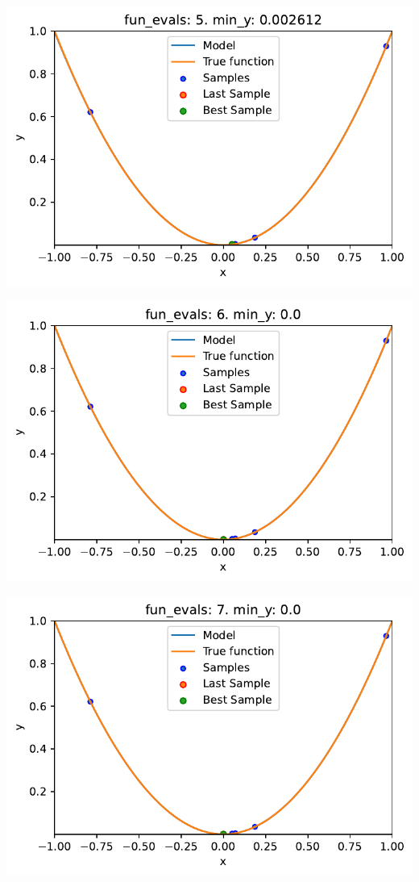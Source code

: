 \documentclass[
  letterpaper,
  DIV=11,
  numbers=noendperiod]{scrreprt}
\begin{document}
\includegraphics{010_num_spot_sklearn_surrogate_files/figure-pdf/cell-24-output-4.pdf}

\includegraphics{010_num_spot_sklearn_surrogate_files/figure-pdf/cell-24-output-5.pdf}

\includegraphics{010_num_spot_sklearn_surrogate_files/figure-pdf/cell-24-output-6.pdf}
\end{document}
